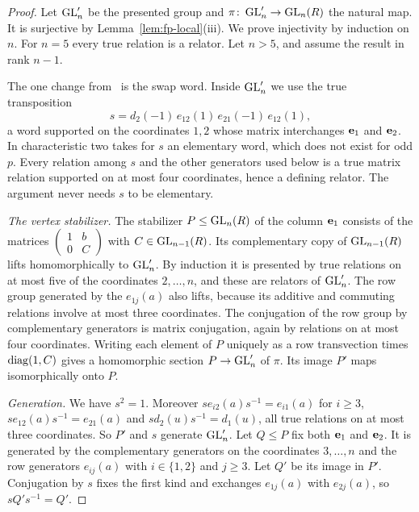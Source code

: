 \begin{proof}
Let $\operatorname{GL}'_n$ be the presented group and $\pi\colon\operatorname{GL}'_n\to\operatorname{GL}_n(R)$ the natural map. It is surjective by
Lemma~\ref{lem:fp-local}(iii). We prove injectivity by induction on $n$. For $n=5$ every true relation is a relator.
Let $n>5$, and assume the result in rank $n-1$.

The one change from~\cite{OAI247periodic} is the swap word. Inside $\operatorname{GL}'_n$ we use the true transposition
\[
 s=d_2(-1)\,e_{12}(1)\,e_{21}(-1)\,e_{12}(1),
\]
a word supported on the coordinates $1,2$ whose matrix interchanges $\mathbf e_1$ and $\mathbf e_2$. In characteristic two
\cite{OAI247periodic} takes for $s$ an elementary word, which does not exist for odd $p$. Every relation among $s$ and
the other generators used below is a true matrix relation supported on at most four coordinates, hence a defining
relator. The argument never needs $s$ to be elementary.

\emph{The vertex stabilizer.} The stabilizer $P\leq\operatorname{GL}_n(R)$ of the column $\mathbf e_1$ consists of the matrices
$\left(\begin{smallmatrix}1&b\\0&C\end{smallmatrix}\right)$ with $C\in\operatorname{GL}_{n-1}(R)$. Its complementary copy of
$\operatorname{GL}_{n-1}(R)$ lifts homomorphically to $\operatorname{GL}'_n$. By induction it is presented by true relations on at most five of the
coordinates $2,\dots,n$, and these are relators of $\operatorname{GL}'_n$. The row group generated by the $e_{1j}(a)$ also lifts,
because its additive and commuting relations involve at most three coordinates. The conjugation of the row group by
complementary generators is matrix conjugation, again by relations on at most four coordinates. Writing each element of
$P$ uniquely as a row transvection times $\operatorname{diag}(1,C)$ gives a homomorphic section $P\to\operatorname{GL}'_n$ of $\pi$. Its image
$P'$ maps isomorphically onto $P$.

\emph{Generation.} We have $s^2=1$. Moreover $se_{i2}(a)s^{-1}=e_{i1}(a)$ for $i\geq3$,
$se_{12}(a)s^{-1}=e_{21}(a)$ and $sd_2(u)s^{-1}=d_1(u)$, all true relations on at most three coordinates. So $P'$ and
$s$ generate $\operatorname{GL}'_n$. Let $Q\leq P$ fix both $\mathbf e_1$ and $\mathbf e_2$. It is generated by the complementary
generators on the coordinates $3,\dots,n$ and the row generators $e_{ij}(a)$ with $i\in\{1,2\}$ and $j\geq3$. Let $Q'$ be
its image in $P'$. Conjugation by $s$ fixes the first kind and exchanges $e_{1j}(a)$ with $e_{2j}(a)$, so
$sQ's^{-1}=Q'$.


\end{proof}
